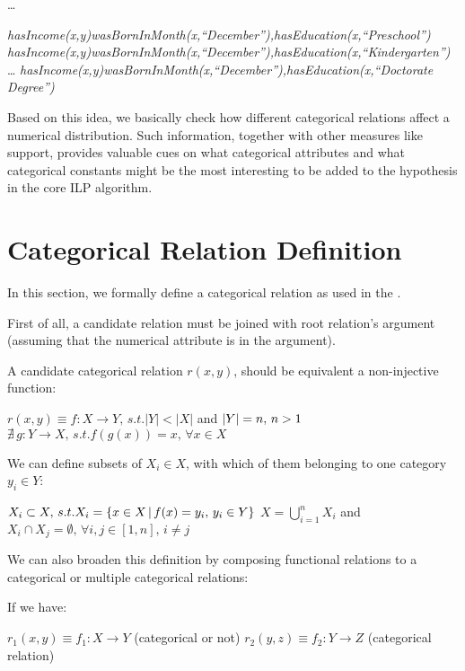  \dots \newline

  \emph{hasIncome(x,y)wasBornInMonth(x,``December''),hasEducation(x,``Preschool'')} \newline
  \emph{hasIncome(x,y)wasBornInMonth(x,``December''),hasEducation(x,``Kindergarten'')} \newline
  \dots \newline
  \emph{hasIncome(x,y)wasBornInMonth(x,``December''),hasEducation(x,``Doctorate Degree'')} \newline


Based on this idea, we basically check how different categorical relations affect a numerical distribution. Such information, together with other measures like support, provides valuable cues on what categorical attributes and what categorical constants might be the most interesting to be added to the hypothesis in the core ILP algorithm.

\section{Categorical Relation Definition}

In this section, we formally define a categorical relation as used in the \graphname. 

First of all, a candidate relation must be joined with root relation's  argument (assuming that the numerical attribute is in the  argument). 

A candidate categorical relation $r(x,y)$, should be equivalent a non-injective function:

$r(x,y) \equiv f : X \rightarrow Y ,\, s.t. |Y|<|X| $ and $  |Y|=n ,\, n>1 \newline $
$\nexists \, g : Y \rightarrow X ,\, s.t. f(g(x))=x ,\, \forall x \in X$

We can define subsets of $X_i \in X$, with which of them belonging to one category $y_i \in Y$:

$X_i \subset X ,\, s.t. X_i = \{x \in X \,|\, f(x)=y_i ,\, y_i \in Y\} \newline $
$X = \bigcup_{i=1}^{n} X_i $ and $ X_i \cap X_j = \emptyset ,\, \forall i,j \in [1,n] ,\, i \neq j$

We can also broaden this definition by composing functional relations to a categorical or multiple categorical relations:

If we have:

$r_1(x,y) \equiv f_1 : X \rightarrow Y$ (categorical or not) \newline
$r_2(y,z) \equiv f_2 : Y \rightarrow Z$ (categorical relation)

